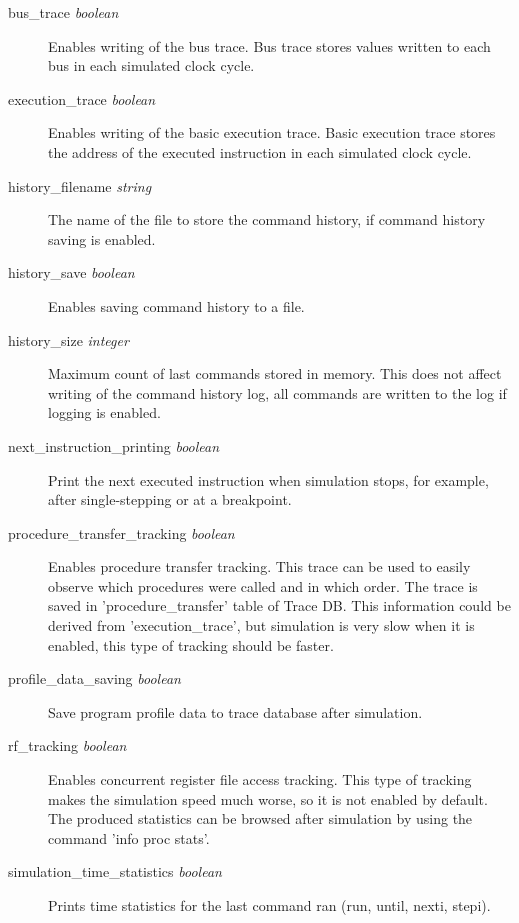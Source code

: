 \documentclass[twoside]{tceusermanual}
\begin{document}
\begin{description}
\item[bus\_trace {\emph{boolean}}] %
  Enables writing of the bus trace. Bus trace stores values written to each bus
in each simulated clock cycle.

\item[execution\_trace  {\emph{boolean}}] %
  Enables writing of the basic execution trace. Basic execution trace stores the
address of the executed instruction in each simulated clock cycle. 

\item[history\_filename {\emph{string}}]%
  The name of the file to store the command history, if command history saving
is enabled.

\item[history\_save {\emph{boolean}}] %
  Enables saving command history to a file.

\item[history\_size {\emph{integer}}]%
 Maximum count of last commands stored in memory. This does not affect writing
of the command history log, all commands are written to the log if logging is
enabled.

\item[next\_instruction\_printing {\emph{boolean}}]%
Print the next executed instruction when simulation stops, for example,
after single-stepping or at a breakpoint. 

\item[procedure\_transfer\_tracking {\emph{boolean}}]%
 Enables procedure transfer tracking. This trace can be used to easily
observe which procedures were 
 called and in which order. The trace is saved in 'procedure\_transfer'
table of Trace DB. This information
 could be derived from 'execution\_trace', but simulation is very slow when
it is enabled, this type of
 tracking should be faster.

\item[profile\_data\_saving {\emph{boolean}}]%
Save program profile data to trace database after simulation.

\item[rf\_tracking {\emph{boolean}}]%
 Enables concurrent register file access tracking. This type of tracking
makes the simulation
 speed much worse, so it is not enabled by default. The produced statistics can
be browsed after simulation by using the command 'info proc stats'.

\item[simulation\_time\_statistics {\emph{boolean}}]%
Prints time statistics for the last command ran (run, until, nexti, stepi).


\end{description}
\end{document}
